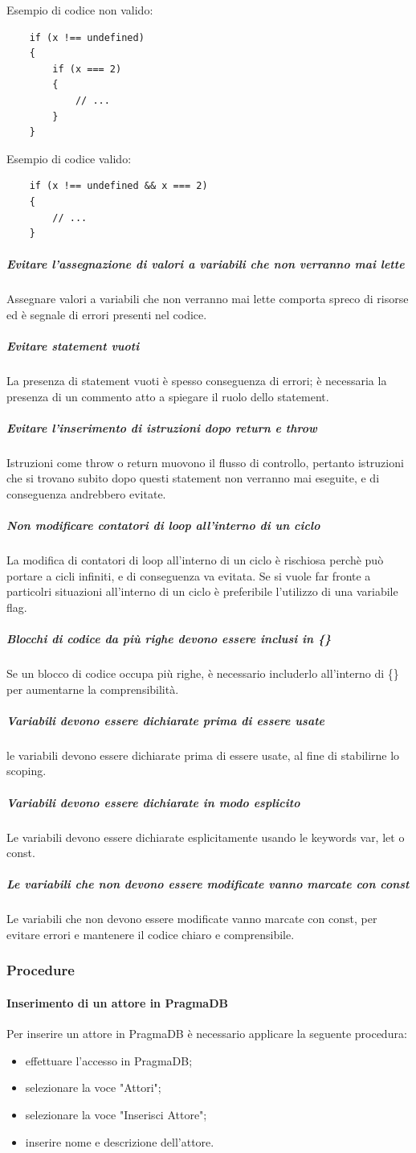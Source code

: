 Esempio di codice non valido:
\begin{verbatim}
	if (x !== undefined) 
	{
  		if (x === 2) 
  		{
    		// ...
  		}
	}
\end{verbatim}
Esempio di codice valido:
\begin{verbatim}
	if (x !== undefined && x === 2) 
	{
  		// ...
	}
\end{verbatim}
\subparagraph{Evitare l'assegnazione di valori a variabili che non verranno mai lette}
Assegnare valori a variabili che non verranno mai lette comporta spreco di risorse ed è segnale di errori presenti nel codice.
\subparagraph{Evitare statement vuoti}
La presenza di statement vuoti è spesso conseguenza di errori; è necessaria la presenza di un commento atto a spiegare il ruolo dello statement.
\subparagraph{Evitare l'inserimento di istruzioni dopo return e throw}
Istruzioni come throw o return muovono il flusso di controllo, pertanto istruzioni che si trovano subito dopo questi statement non verranno mai eseguite, e di conseguenza andrebbero evitate.
\subparagraph{Non modificare contatori di loop all'interno di un ciclo}
La modifica di contatori di loop all'interno di un ciclo è rischiosa perchè può portare a cicli infiniti, e di conseguenza va evitata. Se si vuole far fronte a particolri situazioni all'interno di un ciclo è preferibile l'utilizzo di una variabile flag.
\subparagraph{Blocchi di codice da più righe devono essere inclusi in \{\}}
Se un blocco di codice occupa più righe, è necessario includerlo all'interno di \{\} per aumentarne la comprensibilità.
\subparagraph{Variabili devono essere dichiarate prima di essere usate}
le variabili devono essere dichiarate prima di essere usate, al fine di stabilirne lo scoping.
\subparagraph{Variabili devono essere dichiarate in modo esplicito}
Le variabili devono essere dichiarate esplicitamente usando le keywords var, let o const.
\subparagraph{Le variabili che non devono essere modificate vanno marcate con const}
Le variabili che non devono essere modificate vanno marcate con const, per evitare errori e mantenere il codice chiaro e comprensibile.
 \subsubsection{Procedure}
 \paragraph{Inserimento di un attore in PragmaDB}
 Per inserire un attore in PragmaDB è necessario applicare la seguente procedura:
 \begin{itemize}
 	\item effettuare l'accesso in PragmaDB;
 	\item selezionare la voce "Attori";
 	\item selezionare la voce "Inserisci Attore";
 	\item inserire nome e descrizione dell'attore.
 \end{itemize}
